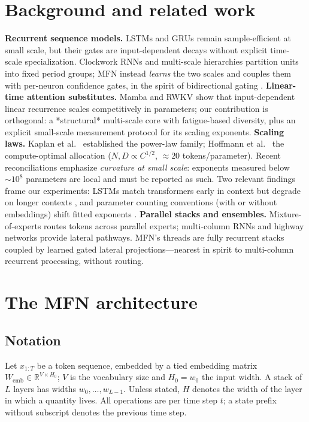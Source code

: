 \documentclass[11pt]{article}
\begin{document}
\section{Background and related work}\label{sec:related}
\textbf{Recurrent sequence models.} LSTMs \citep{hochreiter1997lstm} and
GRUs \citep{cho2014gru} remain sample-efficient at small scale, but their
gates are input-dependent decays without explicit time-scale specialization.
Clockwork RNNs \citep{koutnik2014clockwork} and multi-scale hierarchies
\citep{mikolov2014learning} partition units into fixed period groups; MFN
instead \emph{learns} the two scales and couples them with per-neuron
confidence gates, in the spirit of bidirectional gating
\citep{stopfer1997impaired}.
\textbf{Linear-time attention substitutes.} Mamba \citep{gu2023mamba} and
RWKV \citep{peng2023rwkv} show that input-dependent linear recurrence scales
competitively in parameters; our contribution is orthogonal: a *structural*
multi-scale core with fatigue-based diversity, plus an explicit small-scale
measurement protocol for its scaling exponents.
\textbf{Scaling laws.} Kaplan et al.\ \citep{kaplan2020scaling} established
the power-law family; Hoffmann et al.\ \citep{hoffmann2022chinchilla} the
compute-optimal allocation ($N, D \propto C^{1/2}$, $\approx 20$
tokens/parameter). Recent reconciliations
\citep{pearce2024reconciling,porian2024data} emphasize \emph{curvature at
small scale}: exponents measured below $\sim 10^8$ parameters are local and
must be reported as such. Two relevant findings frame our experiments:
LSTMs match transformers early in context but degrade on longer contexts
\citep{kaplan2020scaling}, and parameter counting conventions (with or
without embeddings) shift fitted exponents
\citep{pearce2024reconciling}.
\textbf{Parallel stacks and ensembles.} Mixture-of-experts
\citep{shazeer2017outrageously} routes tokens across parallel experts;
multi-column RNNs and highway networks \citep{ba2016highway} provide
lateral pathways. MFN's threads are fully recurrent stacks coupled by
learned gated lateral projections---nearest in spirit to multi-column
recurrent processing, without routing.

\section{The MFN architecture}\label{sec:method}
\subsection{Notation}
Let $x_{1:T}$ be a token sequence, embedded by a tied embedding matrix
$W_{\mathrm{emb}} \in \mathbb{R}^{V \times H_0}$; $V$ is the vocabulary size
and $H_0 = w_0$ the input width. A stack of $L$ layers has widths
$w_0, \dots, w_{L-1}$. Unless stated, $H$ denotes the width of the layer in
which a quantity lives. All operations are per time step $t$; a state prefix
without subscript denotes the previous time step.
\end{document}
